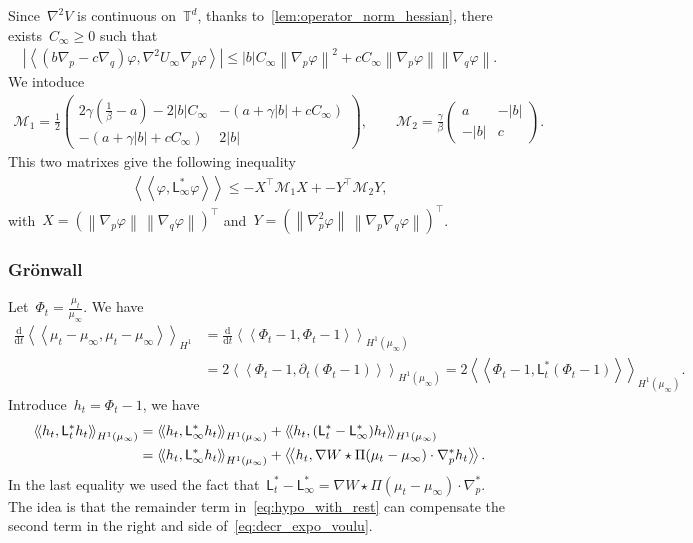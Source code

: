 \documentclass[onefignum,onetabnum]{siamart251216} %
\renewcommand{\d}{\mathrm{d}}
\newcommand{\norm}[1]{\left\lVert#1\right\rVert}
\newcommand{\torus}{\mathbb T}
\newcommand{\mc}[1]{\mathcal{#1}}
\renewcommand{\leq}{\leqslant}
\renewcommand{\geq}{\geqslant}
\newcommand{\mescin}{\mu}
\newcommand{\projp}{\Pi}
\newcommand{\adj}{\mathsf{L}_\infty^*}
\newcommand{\gennonlin}[1]{\mathsf{L}_{#1}}
\newcommand{\slangle}[1]{\left\langle #1 \right\rangle}
\newcommand{\dblangle}[1]{\left\langle\!\left\langle #1 \right\rangle\!\right\rangle}
\theoremstyle{plain}
\numberwithin{equation}{section}
\numberwithin{theorem}{section}
\begin{document}
Since~$\nabla^2V$ is continuous on~$\torus^d$,
thanks to~\cref{lem:operator_norm_hessian},
there exists~$C_\infty \geq 0$ such that
\begin{align*}
    \left|\slangle{(b\nabla_p - c\nabla_q)\varphi,\nabla^2U_\infty\nabla_p\varphi}\right| \leq |b|C_\infty\norm{\nabla_p\varphi}^2 + c C_\infty\norm{\nabla_p\varphi}\norm{\nabla_q\varphi}.
\end{align*}
We intoduce
\begin{align*}
    \mc{M}_1 = \frac12\begin{pmatrix}
                2\gamma\!\left(\frac{1}{\beta}-a\right) -2|b|C_\infty & -(a+\gamma|b|+c C_\infty) \\
                -(a+\gamma|b|+c C_\infty) & 2|b|
                \end{pmatrix}
                 ,
                 \qquad
    \mc{M}_2 =
                \frac{\gamma}{\beta}\begin{pmatrix}
                a & -|b| \\
                -|b| & c
                \end{pmatrix}
                .
\end{align*}
This two matrixes give the following inequality
\begin{align}
    \label{eq:hypo_with_rest}
    \dblangle{\varphi,\adj\varphi} \leq -X^\top \mc{M}_1 X + -Y^\top \mc{M}_2 Y,
\end{align}
with~$X = (\norm{\nabla_p\varphi}\, \norm{\nabla_q\varphi})^\top$ and~$Y = (\norm{\nabla_p^2\varphi}\, \norm{\nabla_p\nabla_q\varphi})^\top$.
\subsubsection*{Grönwall}
Let~$\Phi_t = \displaystyle\frac{\mescin_t}{\mescin_\infty}$.
We have
\begin{align*}
    \frac{\d}{\d t}\dblangle{\mescin_t - \mescin_\infty,\mescin_t - \mescin_\infty}_{H^1}
    &= \frac{\d}{\d t}\dblangle{\Phi_t - 1,\Phi_t - 1}_{H^1(\mescin_\infty)} \\
    &= 2\dblangle{\Phi_t - 1,\partial_t(\Phi_t - 1)}_{H^1(\mescin_\infty)}
    = 2\dblangle{\Phi_t - 1,\gennonlin{t}^*(\Phi_t - 1)}_{H^1(\mescin_\infty)}.
\end{align*}
Introduce~$h_t = \Phi_t - 1$,
we have
\begin{align}
    \notag
    \dblangle{h_t,\gennonlin{t}^*h_t}_{H^1(\mescin_\infty)}
    &= \dblangle{h_t,\adj h_t}_{H^1(\mescin_\infty)} + \dblangle{h_t,(\gennonlin{t}^*-\adj)h_t}_{H^1(\mescin_\infty)} \\
    \label{eq:decr_expo_voulu}
    &= \dblangle{h_t,\adj h_t}_{H^1(\mescin_\infty)} + \dblangle{h_t,\nabla W\star\projp(\mescin_t-\mescin_\infty)\cdot \nabla_p^* h_t}.
\end{align}
In the last equality we used the fact that~$\gennonlin{t}^*-\adj=\nabla W\star\projp(\mescin_t-\mescin_\infty)\cdot \nabla_p^*$.
The idea is that the remainder term in~\eqref{eq:hypo_with_rest} can compensate the second term in the right and side of~\eqref{eq:decr_expo_voulu}.
\fi
\end{document}
